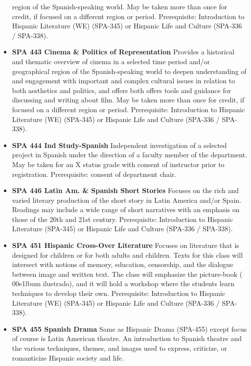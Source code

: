 \documentclass[
  letterpaper,
]{scrbook}
\begin{document}
\begin{itemize}
  region of the Spanish-speaking world. May be taken more than once for
  credit, if focused on a different region or period. Prerequisite:
  Introduction to Hispanic Literature (WE) (SPA-345) or Hispanic Life
  and Culture (SPA-336 / SPA-338).
\item
  \textbf{SPA 443 Cinema \& Politics of Representation} Provides a
  historical and thematic overview of cinema in a selected time period
  and/or geographical region of the Spanish-speaking world to deepen
  understanding of and engagement with important and complex cultural
  issues in relation to both aesthetics and politics, and offers both
  offers tools and guidance for discussing and writing about film. May
  be taken more than once for credit, if focused on a different region
  or period. Prerequisite: Introduction to Hispanic Literature (WE)
  (SPA-345) or Hispanic Life and Culture (SPA-336 / SPA-338).\\
\item
  \textbf{SPA 444 Ind Study-Spanish} Independent investigation of a
  selected project in Spanish under the direction of a faculty member of
  the department. May be taken for an X status grade with consent of
  instructor prior to registration. Prerequisite: consent of department
  chair.
\item
  \textbf{SPA 446 Latin Am. \& Spanish Short Stories} Focuses on the
  rich and varied literary production of the short story in Latin
  America and/or Spain. Readings may include a wide range of short
  narratives with an emphasis on those of the 20th and 21st century.
  Prerequisite: Introduction to Hispanic Literature (SPA-345) or
  Hispanic Life and Culture (SPA-336 / SPA-338).
\item
  \textbf{SPA 451 Hispanic Cross-Over Literature} Focuses on literature
  that is designed for children or for both adults and children. Texts
  for this class will intersect with notions of memory, education,
  censorship, and the dialogue between image and written text. The class
  will emphasize the picture-book ( 00e1lbum ilustrado), and it will
  hold a workshop where the students learn techniques to develop their
  own. Prerequisite: Introduction to Hispanic Literature (WE) (SPA-345)
  or Hispanic Life and Culture (SPA-336 / SPA-338).
\item
  \textbf{SPA 455 Spanish Drama} Same as Hispanic Drama (SPA-455) except
  focus of course is Latin American theatre. An introduction to Spanish
  theatre and the various techniques, themes, and images used to
  express, criticize, or romanticize Hispanic society and life.

\end{itemize}
\end{document}

